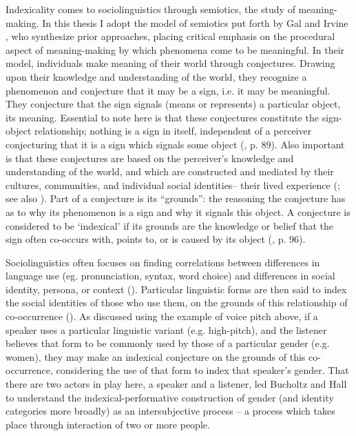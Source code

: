 \documentclass[12pt,twoside]{reedthesis}
\begin{document}
Indexicality comes to sociolinguistics through semiotics, the study of meaning-making. In this thesis I adopt the model of semiotics put forth by Gal and Irvine \parencite*{gal_signs_2019}, who synthesize prior approaches, placing critical emphasis on the procedural aspect of meaning-making by which phenomena come to be meaningful. In their model, individuals make meaning of their world through conjectures. Drawing upon their knowledge and understanding of the world, they recognize a phenomenon and conjecture that it may be a sign, i.e. it may be meaningful. They conjecture that the sign signals (means or represents) a particular object, its meaning. Essential to note here is that these conjectures constitute the sign-object relationship; nothing is a sign in itself, independent of a perceiver conjecturing that it is a sign which signals some object (\cite{gal_signs_2019}, p. 89). Also important is that these conjectures are based on the perceiver's knowledge and understanding of the world, and which are constructed and mediated by their cultures, communities, and individual social identities-- their lived experience (\cite{gal_signs_2019}; see also \cite{calder_whose_2021}). Part of a conjecture is its ``grounds'': the reasoning the conjecture has as to why its phenomenon is a sign and why it signals this object. A conjecture is considered to be `indexical' if its grounds are the knowledge or belief that the sign often co-occurs with, points to, or is caused by its object (\cite{gal_signs_2019}, p. 96).

Sociolinguistics often focuses on finding correlations between differences in language use (eg. pronunciation, syntax, word choice) and differences in social identity, persona, or context (\cite{eckert_three_2012}). Particular linguistic forms are then said to index the social identities of those who use them, on the grounds of this relationship of co-occurrence (\cite{eckert_three_2012}). As discussed using the example of voice pitch above, if a speaker uses a particular linguistic variant (e.g. high-pitch), and the listener believes that form to be commonly used by those of a particular gender (e.g. women), they may make an indexical conjecture on the grounds of this co-occurrence, considering the use of that form to index that speaker's gender. That there are two actors in play here, a speaker and a listener, led Bucholtz and Hall \parencite*{bucholtz_identity_2005, bucholtz_theorizing_2004, bucholtz_locating_2010} to understand the indexical-performative construction of gender (and identity categories more broadly) as an intersubjective process -- a process which takes place through interaction of two or more people.
	
\end{document}
